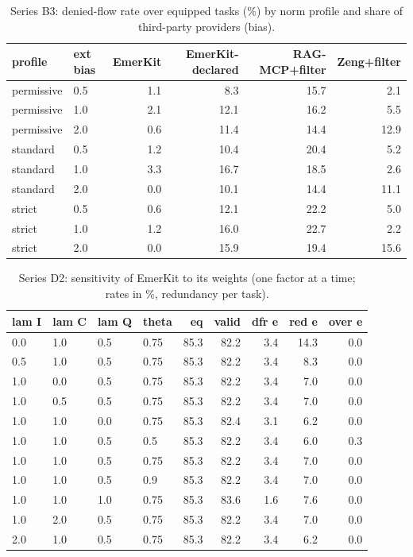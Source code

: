 \begin{table}[!ht]\centering\caption{Series B3: denied-flow rate over equipped tasks (\%) by norm profile and share of third-party providers (bias).}\label{tab:b3}\scriptsize
\begin{tabular}{llrrrr}\toprule
profile & ext bias & EmerKit & EmerKit-declared & RAG-MCP+filter & Zeng+filter \\ \midrule
permissive & 0.5 & 1.1 & 8.3 & 15.7 & 2.1 \\
permissive & 1.0 & 2.1 & 12.1 & 16.2 & 5.5 \\
permissive & 2.0 & 0.6 & 11.4 & 14.4 & 12.9 \\
standard & 0.5 & 1.2 & 10.4 & 20.4 & 5.2 \\
standard & 1.0 & 3.3 & 16.7 & 18.5 & 2.6 \\
standard & 2.0 & 0.0 & 10.1 & 14.4 & 11.1 \\
strict & 0.5 & 0.6 & 12.1 & 22.2 & 5.0 \\
strict & 1.0 & 1.2 & 16.0 & 22.7 & 2.2 \\
strict & 2.0 & 0.0 & 15.9 & 19.4 & 15.6 \\
\bottomrule\end{tabular}\end{table}
\begin{table}[!ht]\centering\caption{Series D2: sensitivity of EmerKit to its weights (one factor at a time; rates in \%, redundancy per task).}\label{tab:d2}\scriptsize
\begin{tabular}{llllrrrrr}\toprule
lam I & lam C & lam Q & theta & eq & valid & dfr e & red e & over e \\ \midrule
0.0 & 1.0 & 0.5 & 0.75 & 85.3 & 82.2 & 3.4 & 14.3 & 0.0 \\
0.5 & 1.0 & 0.5 & 0.75 & 85.3 & 82.2 & 3.4 & 8.3 & 0.0 \\
1.0 & 0.0 & 0.5 & 0.75 & 85.3 & 82.2 & 3.4 & 7.0 & 0.0 \\
1.0 & 0.5 & 0.5 & 0.75 & 85.3 & 82.2 & 3.4 & 7.0 & 0.0 \\
1.0 & 1.0 & 0.0 & 0.75 & 85.3 & 82.4 & 3.1 & 6.2 & 0.0 \\
1.0 & 1.0 & 0.5 & 0.5 & 85.3 & 82.2 & 3.4 & 6.0 & 0.3 \\
1.0 & 1.0 & 0.5 & 0.75 & 85.3 & 82.2 & 3.4 & 7.0 & 0.0 \\
1.0 & 1.0 & 0.5 & 0.9 & 85.3 & 82.2 & 3.4 & 7.0 & 0.0 \\
1.0 & 1.0 & 1.0 & 0.75 & 85.3 & 83.6 & 1.6 & 7.6 & 0.0 \\
1.0 & 2.0 & 0.5 & 0.75 & 85.3 & 82.2 & 3.4 & 7.0 & 0.0 \\
2.0 & 1.0 & 0.5 & 0.75 & 85.3 & 82.2 & 3.4 & 6.2 & 0.0 \\
\bottomrule\end{tabular}\end{table}
